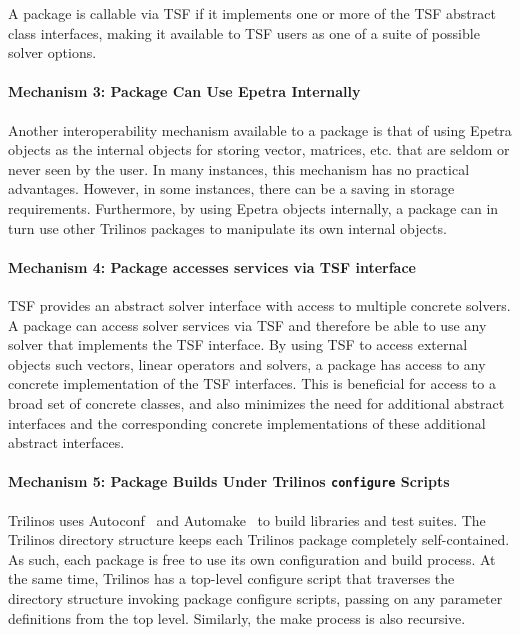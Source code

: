 \documentclass[12pt,relax]{TrilinosOverview}
\begin{document}
A package is callable via TSF if it implements one or more of the TSF
abstract class interfaces, making it available to TSF users as one of a
suite of possible solver options.

\paragraph{Mechanism 3: Package Can Use Epetra Internally}

Another interoperability mechanism available to a package is that of
using Epetra objects as the
internal objects for storing vector, matrices, etc. that are seldom or
never seen by the user.  In many instances, this mechanism has no
practical advantages.  However, in some instances, there can be a
saving in storage requirements.  Furthermore, by using Epetra objects
internally, a package can in turn use other Trilinos packages to
manipulate its own internal objects.

\paragraph{Mechanism 4: Package accesses services via TSF interface}
TSF provides an abstract solver interface with access to multiple concrete 
solvers. 
A package can access solver services via TSF and therefore be able to use
any solver that implements the TSF interface.  By using TSF to access
external objects such vectors, linear operators and solvers, a package
has access to any concrete implementation of the TSF interfaces.  This
is beneficial for access to a broad set of concrete classes, and also
minimizes the need for additional abstract interfaces and the
corresponding concrete implementations of these additional abstract interfaces.

\paragraph{Mechanism 5: Package Builds Under Trilinos {\tt configure} Scripts}
Trilinos uses Autoconf~\cite{Autoconf} and Automake~\cite{Automake} to
build libraries and test suites.  The Trilinos directory structure
keeps each Trilinos package completely self-contained.  As such, each
package is free to use its own configuration and build process.  At
the same time, Trilinos has a top-level configure script that traverses
the directory structure invoking package configure scripts,
passing on any parameter definitions
from the top level.  Similarly, the make process is also recursive.
\end{document}
